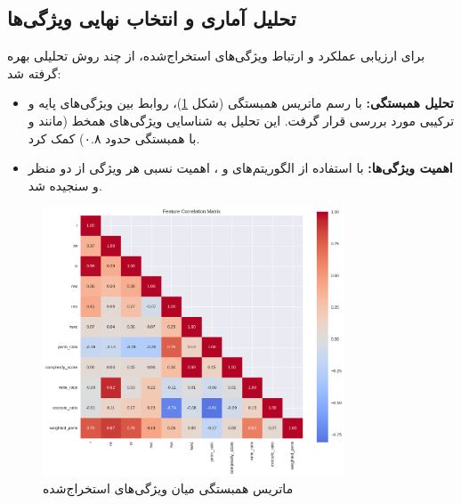 \subsection{تحلیل آماری و انتخاب نهایی ویژگی‌ها} برای ارزیابی عملکرد و ارتباط ویژگی‌های استخراج‌شده، از چند روش تحلیلی بهره گرفته شد:
\begin{itemize}
    \item \textbf{تحلیل همبستگی:} با رسم ماتریس همبستگی (شکل \ref{fig:feature_correlations})، روابط بین ویژگی‌های پایه و ترکیبی مورد بررسی قرار گرفت. این تحلیل به شناسایی ویژگی‌های همخط (مانند  و  با همبستگی حدود ۰.۸) کمک کرد.

    \item \textbf{اهمیت ویژگی‌ها:} با استفاده از الگوریتم‌های  و ، اهمیت نسبی هر ویژگی از دو منظر  و  سنجیده شد.
\end{itemize}

\begin{figure}[ht]
    \centering
    \includegraphics[width=0.8\textwidth]{images/feature_correlations.png}
    \caption{ماتریس همبستگی میان ویژگی‌های استخراج‌شده}
    \label{fig:feature_correlations}
\end{figure}


